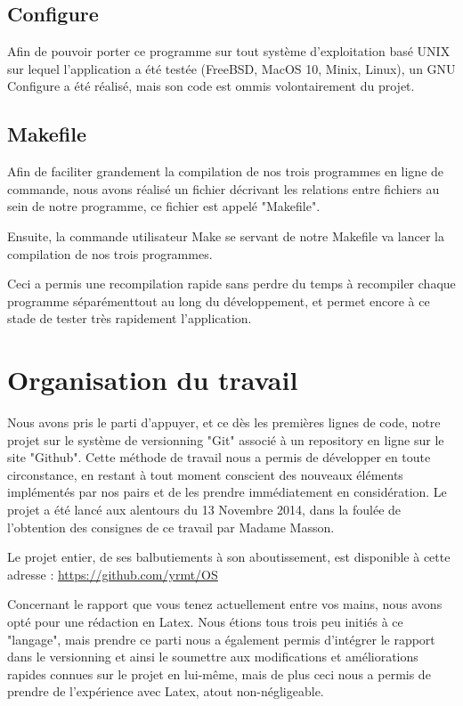 \documentclass{report}
\begin{document}
{		\subsection{Configure}

			Afin de pouvoir porter ce programme sur tout système d'exploitation basé UNIX sur lequel l'application a été testée (FreeBSD, MacOS 10, Minix, Linux), un GNU Configure a été réalisé, mais son code est ommis volontairement du projet.

		\subsection{Makefile}

			Afin de faciliter grandement la compilation de nos trois programmes en ligne de commande, nous avons réalisé un fichier décrivant les
			relations entre fichiers au sein de notre programme, ce fichier est appelé "Makefile". \cite{localUserCommands}

			Ensuite, la commande utilisateur Make se servant de notre Makefile va lancer la compilation de nos trois programmes.

			Ceci a permis une recompilation rapide sans perdre du temps à recompiler chaque programme séparémenttout au long du développement,
			et permet encore à ce stade de tester très rapidement l'application.


	\section{Organisation du travail}

		Nous avons pris le parti d'appuyer, et ce dès les premières lignes de code, notre projet sur le système de versionning "Git" associé
		à un repository en ligne sur le site "Github".
		Cette méthode de travail nous a permis de développer en toute circonstance, en restant à tout moment conscient des nouveaux éléments 
		implémentés par nos pairs et de les prendre immédiatement en considération.
		Le projet a été lancé aux alentours du 13 Novembre 2014, dans la foulée de l'obtention des consignes de ce travail par Madame Masson.

		Le projet entier, de ses balbutiements à son aboutissement, est disponible à cette adresse : \url{https://github.com/yrmt/OS}

		Concernant le rapport que vous tenez actuellement entre vos mains, nous avons opté pour une rédaction en Latex.
		Nous étions tous trois peu initiés à ce "langage", mais prendre ce parti nous a également permis d’intégrer le rapport
		dans le versionning et ainsi le soumettre aux modifications et améliorations rapides connues sur le projet en lui-même, mais de plus
		ceci nous a permis de prendre de l'expérience avec Latex, atout non-négligeable.

}
\end{document}
